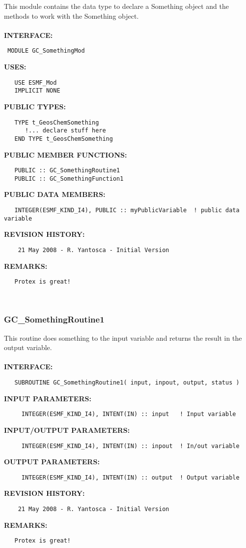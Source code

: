 \documentclass[11pt]{article}
\begin{document}
  This module contains the data type to declare a Something 
     object and the methods to work with the Something object. 
  \\
  \\{\bf INTERFACE:}
\begin{verbatim} MODULE GC_SomethingMod
   \end{verbatim}{\bf USES:}
\begin{verbatim}   USE ESMF_Mod
   IMPLICIT NONE\end{verbatim}{\bf PUBLIC TYPES:}
\begin{verbatim}   TYPE t_GeosChemSomething 
      !... declare stuff here
   END TYPE t_GeosChemSomething\end{verbatim}{\bf PUBLIC MEMBER FUNCTIONS:}
\begin{verbatim}   PUBLIC :: GC_SomethingRoutine1
   PUBLIC :: GC_SomethingFunction1\end{verbatim}{\bf PUBLIC DATA MEMBERS:}
\begin{verbatim}   INTEGER(ESMF_KIND_I4), PUBLIC :: myPublicVariable  ! public data variable\end{verbatim}{\bf REVISION HISTORY:}
\begin{verbatim}    21 May 2008 - R. Yantosca - Initial Version\end{verbatim}{\bf REMARKS:}
\begin{verbatim}   Protex is great!\end{verbatim}
 
 
\mbox{}\hrulefill\ 
 

  \subsubsection [GC\_SomethingRoutine1] {GC\_SomethingRoutine1}


  This routine does something to the input variable and returns 
   the result in the output variable.
  \\
  \\{\bf INTERFACE:}
\begin{verbatim}   SUBROUTINE GC_SomethingRoutine1( input, inpout, output, status )\end{verbatim}{\bf INPUT PARAMETERS:}
\begin{verbatim}     INTEGER(ESMF_KIND_I4), INTENT(IN) :: input   ! Input variable \end{verbatim}{\bf INPUT/OUTPUT PARAMETERS:}
\begin{verbatim}     INTEGER(ESMF_KIND_I4), INTENT(IN) :: inpout  ! In/out variable\end{verbatim}{\bf OUTPUT PARAMETERS:}
\begin{verbatim}     INTEGER(ESMF_KIND_I4), INTENT(IN) :: output  ! Output variable\end{verbatim}{\bf REVISION HISTORY:}
\begin{verbatim}    21 May 2008 - R. Yantosca - Initial Version\end{verbatim}{\bf REMARKS:}
\begin{verbatim}   Protex is great!\end{verbatim}
 
\end{document}

